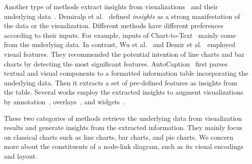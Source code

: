 Another type of methods extract insights from visualizations~\cite{DBLP:conf/diagrams/WuCEC10, DBLP:journals/nrhm/DemirOSECMC10} and their underlying data~\cite{DBLP:conf/inlg/ObeidH20, DBLP:journals/ivs/CuiBYE19}.
Demiralp et al.~\cite{DBLP:journals/pvldb/DemiralpHPP17} defined \textit{insights} as a strong manifestation of the data or the visualization.
Different methods have different preferences according to their inputs.
For example, inputs of Chart-to-Text~\cite{DBLP:conf/inlg/ObeidH20} mainly come from the underlying data.
In contrast, Wu et al.~\cite{DBLP:conf/diagrams/WuCEC10} and Demir et al.~\cite{DBLP:journals/nrhm/DemirOSECMC10} employed visual features.
They recommended the potential intention of line charts and bar charts by detecting the most significant features.
AutoCaption~\cite{DBLP:conf/apvis/LiuXHWY20} first parses textual and visual components to a formatted information table incorporating the underlying data.
Then it extracts a set of pre-defined features as insights from the table.
Several works employ the extracted insights to augment visualizations by annotation~\cite{DBLP:conf/ieeevast/Kandogan12, DBLP:journals/tvcg/BryanMW17}, overlays~\cite{DBLP:journals/tvcg/KongA12},  and widgets~\cite{DBLP:journals/tvcg/SrinivasanDES19}.

These two categories of methods retrieve the underlying data from visualization results and generate insights from the extracted information. 
They mainly focus on classical charts such as line charts, bar charts, and pie charts.
We concern more about the constituents of a node-link diagram, such as its visual encodings and layout.

